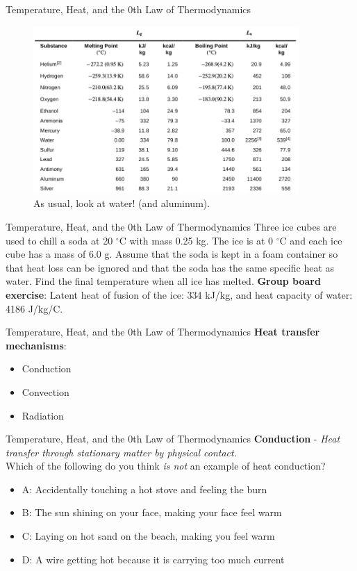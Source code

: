 \documentclass{beamer}
\begin{document}
\begin{frame}{Temperature, Heat, and the 0th Law of Thermodynamics}
\begin{figure}
\centering
\includegraphics[width=0.9\textwidth]{figures/lvlf.png}
\caption{\label{fig:lvlf} As usual, look at water! (and aluminum).}
\end{figure}
\end{frame}

\begin{frame}{Temperature, Heat, and the 0th Law of Thermodynamics}
Three ice cubes are used to chill a soda at 20 $^\circ$C with mass 0.25 kg. The ice is at 0 $^\circ$C and each ice cube has a mass of 6.0 g. Assume that the soda is kept in a foam container so that heat loss can be ignored and that the soda has the same specific heat as water. Find the final temperature when all ice has melted.
\textbf{Group board exercise}: Latent heat of fusion of the ice: 334 kJ/kg, and heat capacity of water: 4186 J/kg/C.
\end{frame}

\begin{frame}{Temperature, Heat, and the 0th Law of Thermodynamics}
\textbf{Heat transfer mechanisms}:
\begin{itemize}
\item Conduction
\item Convection
\item Radiation
\end{itemize}
\end{frame}

\begin{frame}{Temperature, Heat, and the 0th Law of Thermodynamics}
\textbf{Conduction} - \textit{Heat transfer through stationary matter by physical contact.} \\ \vspace{0.5cm}
Which of the following do you think \textit{is not} an example of heat conduction?
\begin{itemize}
\item A: Accidentally touching a hot stove and feeling the burn
\item B: The sun shining on your face, making your face feel warm
\item C: Laying on hot sand on the beach, making you feel warm
\item D: A wire getting hot because it is carrying too much current
\end{itemize}
\end{frame}
\end{document}
